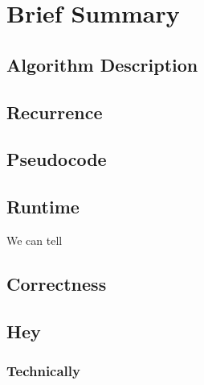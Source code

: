 \documentclass[12pt]{article}
\begin{document}



\section{Brief Summary}

\subsection*{Algorithm Description}

\subsection*{Recurrence}
\samplePiece

\subsection*{Pseudocode}
\sampleAlgo

\subsection*{Runtime}
We can tell 

\subsection*{Correctness}




\setcounter{section}{2}
\newpage
\subsection{Hey}
\subsubsection*{Technically}
\end{document}
